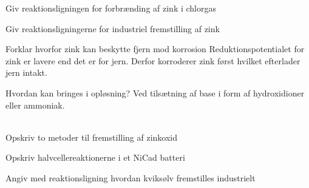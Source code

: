 
\begin{flashcard}[Struktur]{Giv reaktionsligningen for forbrænding af zink i chlorgas}
\end{flashcard}

\begin{flashcard}[Fremstilling]{Giv reaktionsligningerne for industriel fremstilling af zink}
\\\vspace*{0.5cm}
\end{flashcard}

\begin{flashcard}[Egenskab]{Forklar hvorfor zink kan beskytte fjern mod korrosion}
Reduktionspotentialet for zink er lavere end det er for jern. Derfor korroderer zink først hvilket efterlader jern intakt.
\end{flashcard}

\begin{flashcard}[Egenskab]{Hvordan kan  bringes i opløsning?}
Ved tilsætning af base i form af hydroxidioner eller ammoniak.\\\vspace*{0.5cm}
\\
\end{flashcard}

\begin{flashcard}[Fremstilling]{Opskriv to metoder til fremstilling af zinkoxid}
\\\vspace*{0.5cm}
\end{flashcard}

\begin{flashcard}[Anvendelse]{Opskriv halvcellereaktionerne i et NiCad batteri}
\\\vspace*{0.5cm}
\end{flashcard}

\begin{flashcard}[Fremstilling]{Angiv med reaktionsligning hvordan kviksølv fremstilles industrielt}
\end{flashcard}

